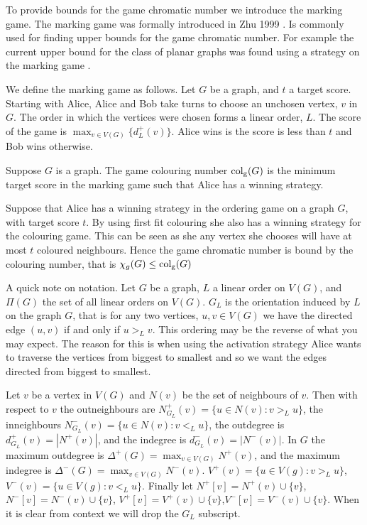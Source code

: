 To provide bounds for the game chromatic number we introduce the marking game. The marking game was formally introduced in Zhu 1999 \cite{Zhu1999}. Is commonly used for finding upper bounds for the game chromatic number. For example the current upper bound for the class of planar graphs was found using a strategy on the marking game \cite{Zhu2008}.

We define the marking game as follows. Let $G$ be a graph, and $t$ a target score. Starting with Alice, Alice and Bob take turns to choose an unchosen vertex, $v$ in $G$. The order in which the vertices were chosen forms a linear order, $L$. The score of the game is $\max_{v\in V(G)}\{d^+_L(v)\}$. Alice wins is the score is less than $t$ and Bob wins otherwise.

\begin{definition}
    Suppose $G$ is a graph. The game colouring number $\operatorname{col_g}(G)$ is the minimum target score in the marking game such that Alice has a winning strategy. 
\end{definition}

Suppose that Alice has a winning strategy in the ordering game on a graph $G$, with target score $t$. By using first fit colouring she also has a winning strategy for the colouring game. This can be seen as she any vertex she chooses will have at most $t$ coloured neighbours. Hence the game chromatic number is bound by the colouring number, that is $\chi_g(G)\leq\operatorname{col_g}(G)$


A quick note on notation. Let $G$ be a graph, $L$ a linear order on $V(G)$, and $\Pi(G)$ the set of all linear orders on $V(G)$. $G_L$ is the orientation induced by $L$ on the graph $G$, that is for any two vertices, $u,v\in V(G)$ we have the directed edge $(u,v)$ if and only if $u>_Lv$. This ordering may be the reverse of what you may expect. The reason for this is when using the activation strategy Alice wants to traverse the vertices from biggest to smallest and so we want the edges directed from biggest to smallest.

Let $v$ be a vertex in $V(G)$ and $N(v)$ be the set of neighbours of $v$. Then with respect to $v$ the outneighbours are $N^+_{G_L}(v)=\{u\in N(v):v>_L u\}$, the inneighbours $N^-_{G_L}(v)=\{u\in N(v):v<_L u\}$, the outdegree is $d^+_{G_L}(v)=|N^+(v)|$, and the indegree is $d^-_{G_L}(v)=|N^-(v)|$. In $G$ the maximum outdegree is $\Delta^+(G)=\max_{v\in V(G)}N^+(v)$, and the maximum indegree is $\Delta^-(G)=\max_{v\in V(G)}N^-(v)$. $V^+(v)=\{u\in V(g):v>_L u\}$, $V^-(v)=\{u\in V(g):v<_L u\}$. Finally let $N^+[v]=N^+(v)\cup\{v\}$, $N^-[v]=N^-(v)\cup\{v\}$, $V^+[v]=V^+(v)\cup\{v\}$,$V^-[v]=V^-(v)\cup\{v\}$. When it is clear from context we will drop the $G_L$ subscript.  %
 
